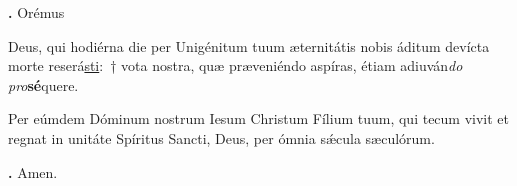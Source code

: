 \textbf{\Vbar.} Orémus

Deus, qui hodiérna die per Unigénitum tuum æternitátis nobis áditum devícta morte reserá\underline{sti}:~† 
vota nostra, quæ præveniéndo aspíras, étiam adiuván\textit{do pro}\textbf{sé}quere.

Per eúmdem Dóminum nostrum Iesum Christum Fílium tuum, qui tecum vivit et regnat in unitáte Spíritus Sancti, Deus, per ómnia s\'{\ae}cula sæculórum.

\textbf{\Rbar.} Amen.

